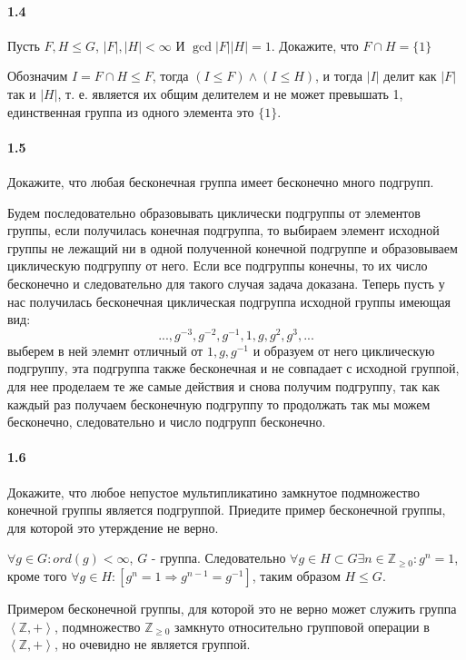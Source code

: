 \documentclass[a4paper,12pt]{article}
\begin{document}
\paragraph{1.4} Пусть $F,H \le G$, $\left|F\right|,\left|H\right| < \infty$ И $\gcd{\left|F\right|}{\left|H\right|} = 1$. Докажите, что $F \cap H = \{1\}$

\begin{Proof}
Обозначим $I = F \cap H \le F$, тогда $\left(I \le F\right) \land \left(I \le H\right)$, и тогда $\left|I\right|$ делит как $\left|F\right|$ так и $\left|H\right|$, т. е. является их общим делителем и не может превышать 1, единственная группа из одного элемента это $\{1\}$.
\end{Proof}

\paragraph{1.5} Докажите, что любая бесконечная группа имеет бесконечно много подгрупп.

\begin{Proof}
Будем последовательно образовывать циклически подгруппы от элементов группы, если получилась конечная подгруппа, то выбираем элемент исходной группы не лежащий ни в одной полученной конечной подгруппе и образовываем циклическую подгруппу от него. Если все подгруппы конечны, то их число бесконечно и следовательно для такого случая задача доказана. Теперь пусть у нас получилась бесконечная циклическая подгруппа исходной группы имеющая вид:
\[
	..., g^{-3}, g^{-2}, g^{-1}, 1, g, g^2, g^3, ...
\]
выберем в ней элемнт отличный от $1, g, g^{-1}$ и образуем от него циклическую подгруппу, эта подгруппа также бесконечная и не совпадает с исходной группой, для нее проделаем те же самые действия и снова получим подгруппу, так как каждый раз получаем бесконечную подгруппу то продолжать так мы можем бесконечно, следовательно и число подгрупп бесконечно.
\end{Proof}

\paragraph{1.6} Докажите, что любое непустое мультипликатино замкнутое подмножество конечной группы является подгруппой. Приедите пример бесконечной группы, для которой это утерждение не верно.

\begin{Solution}
$\forall g \in G : ord\left(g\right) < \infty$, $G$ - группа. Следовательно $\forall g \in H \subset G \exists n \in \mathbb{Z}_{\ge 0} : g^n = 1 $, кроме того $\forall g \in H : \left[g^n = 1 \Rightarrow g^{n-1} = g^{-1}\right]$, таким образом $H \le G$.

Примером бесконечной группы, для которой это не верно может служить группа $\left<\mathbb{Z}, +\right>$, подмножество $\mathbb{Z}_{\ge 0}$ замкнуто относительно групповой операции в $\left<\mathbb{Z}, +\right>$, но очевидно не является группой.
\end{Solution}
\end{document}
